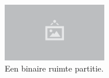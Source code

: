 \begin{figure}
  \centering
  \includegraphics[width=0.4\textwidth]{./img/raw/placeholder.png}
  \caption{Een binaire ruimte partitie.}
  \label{fig:hs-datastructuur-bsp}
\end{figure}
